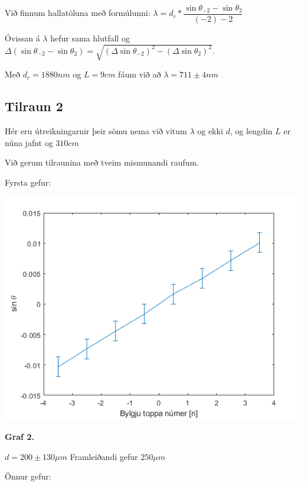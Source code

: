 \documentclass[12pt]{article}
\begin{document}
Við finnum hallatöluna með formúlunni:
$\lambda = d_r*\dfrac{\sin{\theta_{-2}}-\sin{\theta_{2}}}{(-2)-2} $

Óvissan á $\lambda$ hefur sama hlutfall og 
$\Delta (\sin{\theta_{-2}}-\sin{\theta_{2}})=\sqrt{(\Delta \sin{\theta_{-2}})^2-(\Delta \sin{\theta_{2}})^2}$.

Með $d_r=1880nm$ og $L = 9cm$ fáum við að $\lambda=711 \pm 4 nm$

\subsection{Tilraun 2}

Hér eru útreikningarnir þeir sömu nema við vitum $\lambda$ og ekki $d$, og lengdin $L$ er núna jafnt og $310 cm$

Við gerum tilraunina með tveim mismunandi raufum.

Fyrsta gefur:

\begin{center}
    \includegraphics[scale=0.5]{html/data_02.png}

    \bf Graf 2.
\end{center}

$d = 200 \pm 130 \mu m$
Framleiðandi gefur $250 \mu m$

Önnur gefur:
\end{document}
